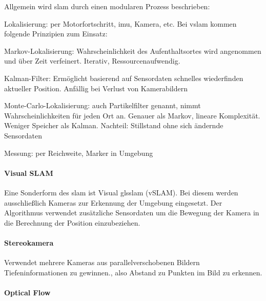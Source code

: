 Allgemein wird \gls{slam} durch einen modularen Prozess beschrieben: \begin{compactdesc}
    \item[Lokalisierung:] per Motorfortschritt, \gls{imu}, Kamera, etc.\newline
    Bei v\gls{slam} kommen folgende Prinzipien zum Einsatz:
\end{compactdesc}
\begin{compactitem}
    \item Markov-Lokalisierung: Wahrscheinlichkeit des Aufenthaltsortes wird angenommen und über Zeit verfeinert. Iterativ, Ressourcenaufwendig.
	\item Kalman-Filter: Ermöglicht basierend auf Sensordaten schnelles wiederfinden aktueller Position. Anfällig bei Verlust von Kamerabildern
	\item Monte-Carlo-Lokalisierung: auch Partikelfilter genannt, nimmt Wahrscheinlichkeiten für jeden Ort an. Genauer als Markov, lineare Komplexität. Weniger Speicher als Kalman. Nachteil: Stillstand ohne sich ändernde Sensordaten
\end{compactitem}
\begin{compactdesc}
    \item[Messung:] per Reichweite, Marker in Umgebung
\end{compactdesc}

\paragraph*{Visual SLAM} 
Eine Sonderform des \gls{slam} ist Visual gls{slam} (vSLAM). Bei diesem werden ausschließlich Kameras zur Erkennung der Umgebung eingesetzt. Der Algorithmus verwendet zusätzliche Sensordaten um die Bewegung der Kamera in die Berechnung der Position einzubeziehen.

\paragraph*{Stereokamera}
Verwendet mehrere Kameras aus parallelverschobenen Bildern Tiefeninformationen zu gewinnen., also Abstand zu Punkten im Bild zu erkennen.
\paragraph*{Optical Flow}
